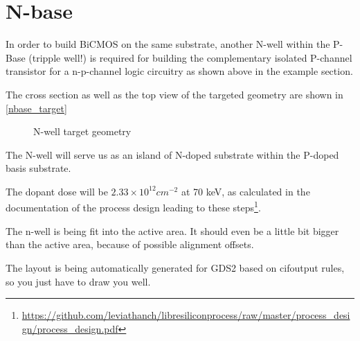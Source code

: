 \section{N-base}\label{nbase_chapter}
In order to build BiCMOS on the same substrate, another N-well within the P-Base (tripple well!) is required for building the complementary isolated P-channel transistor for a n-p-channel logic circuitry as shown above in the example section.

The cross section as well as the top view of the targeted geometry are shown in \autoref{nbase_target}

\begin{figure}[H]
	\centering
	\begin{tikzpicture}[node distance = 3cm, auto, thick,scale=\CrossAndTopSectionBig, every node/.style={transform shape}]
		
	\end{tikzpicture}
	\begin{tikzpicture}[node distance = 3cm, auto, thick,scale=\CrossAndTopSectionBig, every node/.style={transform shape}]
		
	\end{tikzpicture}
	\caption{N-well target geometry}
	\label{nbase_target}
\end{figure}

The N-well will serve us as an island of N-doped substrate within the P-doped basis substrate.

The dopant dose will be $2.33\times10^{12}cm^{-2}$ at 70 keV, as calculated in the documentation of the process design leading to these steps\footnote{\url{https://github.com/leviathanch/libresiliconprocess/raw/master/process_design/process_design.pdf}}.

%		


The n-well is being fit into the active area. It should even be a little bit bigger than the active area, because of possible alignment offsets.

The layout is being automatically generated for GDS2 based on cifoutput rules, so you just have to draw you well.

\newpage

